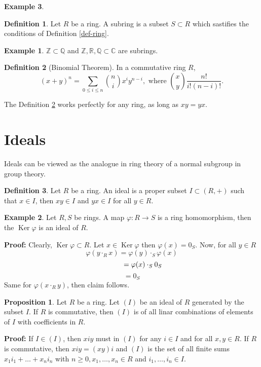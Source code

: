 \documentclass[11pt]{amsbook}%
\theoremstyle{plain}
\theoremstyle{definition}
\newtheorem{definition*}{Definition}
\newtheorem*{example*}{Example}
\newtheorem{proposition}[theorem]{Proposition}
\numberwithin{equation}{section}
\newcommand{\CC}{\mathbb C}
\newcommand{\QQ}{\mathbb Q}
\newcommand{\RR}{\mathbb R}
\newcommand{\ZZ}{\mathbb Z}
\renewcommand{\proof}{ \textbf{Proof: }}
\DeclareMathOperator{\Ker}{Ker}
\begin{document}
\begin{example*}
\begin{definition*}
  Let $R$ be a ring. A subring is a subset $S \subset R$ which sastifies the conditions of Definition \ref{def-ring}.
\end{definition*}

\begin{example*}
  $\ZZ \subset \QQ$ and $\ZZ, \RR, \QQ \subset \CC$ are subrings.
\end{example*}

\begin{definition*}[Binomial Theorem]
  \label{def-binomial-theorem}
  In a commutative ring $R$,
  $$
  (x + y)^{n} = \sum_{0 \leq i \leq n} \binom{n}{i} x^{i}y^{n-i}, \text{ where }  \binom{x}{y} \frac{n!}{i!(n-i)!}.
  $$
\end{definition*}
The Definition \ref{def-binomial-theorem} works perfectly for any ring, as long as $xy = yx$.

\section{Ideals}
Ideals can be viewed as the analogue in ring theory of a normal subgroup in group theory.
\begin{definition*}
  Let $R$ be a ring. An ideal is a proper subset $I \subset (R, +)$ such that $x \in I$, then $xy \in I$
  and $yx \in I$ for all $y \in R$.
\end{definition*}

\begin{example*}
  Let $R, S$ be rings. A map $\varphi: R \longrightarrow S$ is a ring homomorphism, then the
  $\Ker \varphi$ is an ideal of $R$.
\end{example*}
\proof Clearly, $\Ker \varphi \subset R$. Let $x \in \Ker \varphi$ then $\varphi(x) = 0_{S}$.
Now, for all $y \in R$
$$
\varphi(y \cdot_{R} x) = \varphi(y) \cdot_{S}  \varphi(x)
$$ 
$$
\hspace{3.2em} = \varphi(x) \cdot_{S} 0_{S}
$$
$$
= 0_{S}
$$
Same for $\varphi(x \cdot_{R} y)$, then claim follows. \qedsymbol

\begin{proposition}
  \label{prop-ideal-generated}
  Let $R$ be a ring. Let $(I)$ be an ideal of $R$ generated by the subset $I$.
  If $R$ is commutative, then $(I)$ is of all linar combinations of elements of $I$
  with coefficients in $R$.
\end{proposition} \vspace{1.8em}
\proof If $I \in (I)$, then $xiy$ must in $(I)$ for any $i \in I$ and for all $x, y \in R$.
If $R$ is commutative, then $xiy = (xy)i$ and $(I)$ is the set of all finite sums $x_{1}i_{1} + \dots + x_{n}i_{n}$
with $n \geq 0, x_{1}, \dots, x_{n} \in R$ and $i_{1}, \dots, i_{n} \in I$. \qedsymbol


\end{example*}
\end{document}
